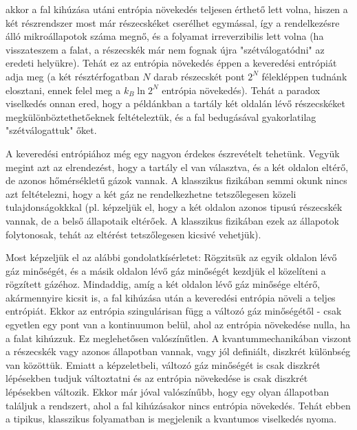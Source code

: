 \documentclass[../main.tex]{subfiles}
\begin{document}
akkor a fal kihúzása utáni entrópia növekedés teljesen érthető lett volna, hiszen a két részrendszer most már részecskéket cserélhet egymással, így a rendelkezésre álló mikroállapotok száma megnő, és
a folyamat irreverzibilis lett volna (ha visszateszem a falat, a részecskék már nem fognak újra "szétválogatódni" az eredeti helyükre). Tehát ez az entrópia növekedés éppen a keveredési entrópiát adja meg
(a két résztérfogatban $N$ darab részecskét pont $2^N$ félekléppen tudnánk elosztani, ennek felel meg a $k_B \ln 2^N$ entrópia növekedés). Tehát a paradox viselkedés onnan ered, hogy a példánkban a 
tartály két oldalán lévő részecskéket megkülönböztethetőeknek feltételeztük, és a fal bedugásával gyakorlatilag "szétválogattuk" őket. 

A keveredési entrópiához még egy nagyon érdekes észrevételt tehetünk. Vegyük megint azt az elrendezést, hogy a tartály el van választva, és a két oldalon eltérő, de azonos hőmérsékletű gázok vannak.
A klasszikus fizikában semmi okunk nincs azt feltételezni, hogy a két gáz ne rendelkezhetne tetszőlegesen közeli tulajdonságokkkal (pl. képzeljük el, hogy a két oldalon azonos tipusú részecskék vannak, 
de a belső állapotaik eltérőek. A klasszikus fizikában ezek az állapotok folytonosak, tehát az eltérést tetszőlegesen kicsivé vehetjük). 

Most képzeljük el az alábbi gondolatkísérletet: Rögzitsük az egyik oldalon lévő gáz minőségét, és a másik oldalon lévő gáz minőségét kezdjük el közelíteni a rögzített gázéhoz.
Mindaddig, amíg a két oldalon lévő gáz minősége eltérő, akármennyire kicsit is, a fal kihúzása után a keveredési entrópia növeli a teljes entrópiát. Ekkor az entrópia szingulárisan függ a változó gáz
minőségétől - csak egyetlen egy pont van a kontinuumon belül, ahol az entrópia növekedése nulla, ha a falat kihúzzuk. Ez meglehetősen valószínűtlen. A kvantummechanikában viszont a részecskék vagy azonos állapotban vannak,
vagy jól definiált, diszkrét különbség van közöttük. Emiatt a képzeletbeli, változó gáz minőségét is csak diszkrét lépésekben tudjuk változtatni és az entrópia növekedése is csak diszkrét lépésekben változik.
Ekkor már jóval valószínűbb, hogy egy olyan állapotban találjuk a rendszert, ahol a fal kihúzásakor nincs entrópia növekedés. Tehát ebben a tipikus, klasszikus folyamatban is megjelenik a kvantumos viselkedés nyoma.
\end{document}
